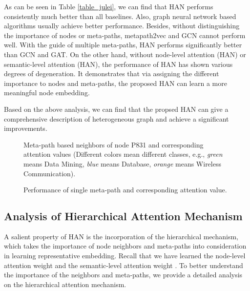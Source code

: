 As can be seen in Table \ref{table_julei}, we can find that HAN performs consistently much better than all baselines. Also, 
graph neural network based algorithms usually achieve better performance. 
Besides, without distinguishing the importance of nodes or meta-paths, 
metapath2vec and GCN cannot perform well.
With the guide of multiple meta-paths, HAN performs significantly better than GCN and GAT. 
On the other hand, without node-level attention (HAN) or semantic-level attention (HAN), the performance of HAN has shown various degrees of degeneration. It demonstrates that via assigning the different importance to nodes and meta-paths, the proposed HAN can learn a more meaningful node embedding. 

Based on the above analysis, we can find that the propsed HAN can give a comprehensive description of heterogeneous graph and achieve a significant improvements.


\begin{figure}
	\centering
{}
	\caption{Meta-path based neighbors of node P831 and corresponding attention values (Different colors mean different classes, e.g., \emph{green} means Data Mining, \emph{blue} means Database, \emph{orange} means Wireless Communication).}
	\label{fig_node_att}
\end{figure}



\begin{figure}
	\centering
{}
\caption{Performance of single meta-path and corresponding attention value.}
	\label{fig_att_metapath}
\end{figure}





\subsection{Analysis of Hierarchical Attention Mechanism}
A salient property of HAN is the incorporation of the hierarchical mechanism, 
which takes the importance of node neighbors and meta-paths into consideration in learning representative embedding. 
Recall that we have learned the node-level attention weight  and the semantic-level attention weight . To better understand the importance of the neighbors and meta-paths, we provide a detailed analysis on the hierarchical attention mechanism.

